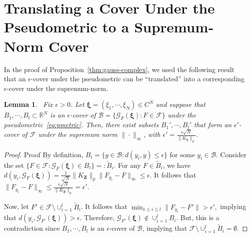 \documentclass[11pt,leqno]{amsart}
\newtheorem{lemma}{Lemma}
\begin{document}
\section{Translating a Cover Under the Pseudometric to a Supremum‐Norm Cover}\label{sec:coverproof}
In the proof of Proposition~\ref{thm:gauss-complex}, we used the following result that an $\epsilon$-cover under the pseudometric can be ``translated'' into a corresponding $\epsilon$-cover under the supremum-norm.
\begin{lemma}~\label{lem:e-cover}
Fix $\epsilon > 0$. Let $ \boldsymbol\xi  = (\xi_1,\cdots,\xi_N)\in C^N$ and suppose that $B_1, \cdots, B_l \subset \mathbb R^N$ is an $\epsilon$-cover of 
$\mathcal{B} = \{\mathcal{G}_F( \boldsymbol\xi ) : F \in \mathcal{F}\}$ under the pseudometric~\eqref{eq:pmetric}. Then, there exist subsets $B_1',\cdots, B_l'$ that form an $\epsilon'$-cover of $\mathcal{F}$ under the supremum norm $\|\cdot\|_\infty$, with $\epsilon' = \frac{\epsilon \sqrt N}{ \|K_{ \boldsymbol\xi }\|_{p}}$.
\end{lemma}

\begin{proof}{Proof}
By definition, $B_i = \{y \in \mathcal{B} : d(y_i,y) \leq \epsilon\}$ for some $y_i \in \mathcal{B}$. Consider the set $\{F \in \mathcal F : \mathcal{G}_F( \boldsymbol\xi )\in B_i\} =: \tilde{B}_i$. For any $F \in \tilde{B}_i$, we have
 \(   d(y_i, \mathcal{G}_F( \boldsymbol\xi )) = \frac{1}{\sqrt{N}} \|K_{\mathbf{Z}}\|_{p} \|F_{y_i} - F\|_{\infty} \leq \epsilon.
 \)
It follows that
\(
\|F_{y_i} - F\|_{\infty} \leq \frac{\epsilon \sqrt{N}}{\|K_{\mathbf{Z}}\|_{p}} = \epsilon'.
\)

Now, let $F' \in \mathcal{F}\setminus\cup_{i=1}^l \tilde{B}_i$. It follows that
\(
    \min_{1 \leq i \leq l} \|F_{y_i} - F'\| > \epsilon',
\)
 implying that $d(y_i,\mathcal{G}_{F'}( \boldsymbol\xi )) > \epsilon$. Therefore, $\mathcal{G}_{F'}( \boldsymbol\xi ) \not\in \cup_{i=1}^l B_i$. But, this is a contradiction since $B_1,\cdots,B_l$ is an $\epsilon$-cover of $\mathcal{B}$, implying that $\mathcal{F}\setminus\cup_{i=1}^l \tilde{B}_i = \emptyset$.
 
\end{proof}
\end{document}
